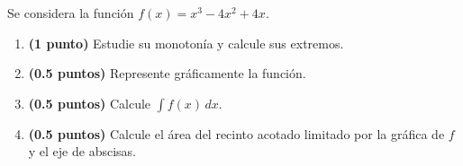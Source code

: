 
Se considera la función $f(x)=x^3-4x^2+4x$.
\begin{enumerate}[label=\alph*)]
  \item \textbf{(1 punto)} Estudie su monotonía y calcule sus extremos.
  \item \textbf{(0.5 puntos)} Represente gráficamente la función.
  \item \textbf{(0.5 puntos)} Calcule $\displaystyle\int f(x)\,dx$.
  \item \textbf{(0.5 puntos)} Calcule el área del recinto acotado limitado
  por la gráfica de $f$ y el eje de abscisas.
\end{enumerate}
